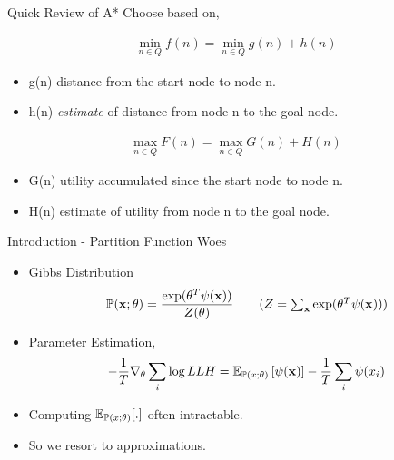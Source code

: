 \begin{frame}{Quick Review of A*}
  Choose based on,
  \begin{overprint}
    \begin{align*}
      \min_{n \in Q} f(n) = \min_{n \in Q} g(n) + h(n)
    \end{align*}
    \begin{itemize}
    \item g(n) distance from the start node to node n.
    \item h(n) \emph{estimate} of distance from node n to the goal node.
    \end{itemize}
    \begin{align*}
      \max_{n \in Q} F(n) = \max_{n \in Q} G(n) + H(n)
    \end{align*}
    \begin{itemize}
    \item G(n) utility accumulated since the start node to node n.
    \item H(n) estimate of utility from node n to the goal node.
    \end{itemize}
  \end{overprint}
\end{frame}
\begin{frame}{Introduction - Partition Function Woes}
  \begin{itemize}[<+->]
  \item Gibbs Distribution
    \begin{align*}
      \Pr(\x;\theta) =\frac{\exp(\theta^T\psi(\x))}{Z(\theta)} \tag{$Z=\sum_{\x} \exp(\theta^T\psi(\x))$}
    \end{align*}
  \item Parameter Estimation,
    \begin{align*}
      - \frac{1}{T}\nabla_\theta \sum_i\log LLH = \operatorname{\mathbb{E}}_{\mathbb{P}(x;\theta)}\left[\psi(\operatorname{\mathbf{x}})\right] - \frac{1}{T} \sum_i\psi(x_i)
    \end{align*}
  \item Computing $\operatorname{\mathbb{E}}_{\mathbb{P}(x;\theta)}[.]$ often intractable.
  \item So we resort to approximations.
  \end{itemize}
\end{frame}

